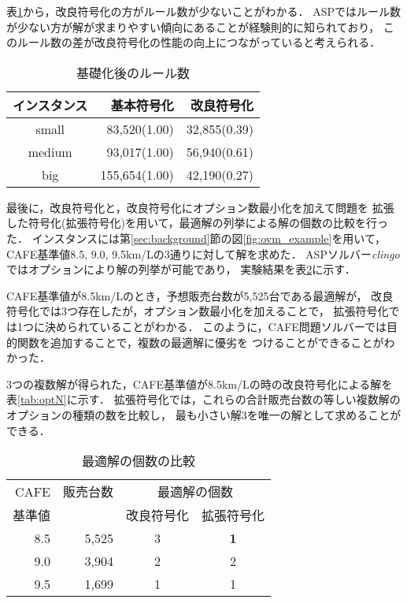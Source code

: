 表\ref{tab:rule}から，改良符号化の方がルール数が少ないことがわかる．
ASPではルール数が少ない方が解が求まりやすい傾向にあることが経験則的に知られており，
このルール数の差が改良符号化の性能の向上につながっていると考えられる．

\begin{table}[tb]
 \caption{基礎化後のルール数}
 \centering
 \begin{tabular}{crr} \bhline
  インスタンス & 基本符号化    & 改良符号化    \\ \hline
  small	    & 83,520(1.00)  & 32,855(0.39) \\ 
  medium    & 93,017(1.00)  & 56,940(0.61) \\
  big	    & 155,654(1.00) & 42,190(0.27) \\ \hline
 \end{tabular}
 \label{tab:rule}
\end{table}


最後に，改良符号化と，改良符号化にオプション数最小化を加えて問題を
拡張した符号化(拡張符号化)を用いて，最適解の列挙による解の個数の比較を行った．
インスタンスには第\ref{sec:background}節の図\ref{fig:ovm_example}を用いて，
CAFE基準値8.5, 9.0, 9.5km/Lの3通りに対して解を求めた．
ASPソルバー\textit{clingo}ではオプションにより解の列挙が可能であり，
実験結果を表\ref{tab:option}に示す．

CAFE基準値が8.5km/Lのとき，予想販売台数が5,525台である最適解が，
改良符号化では3つ存在したが，オプション数最小化を加えることで，
拡張符号化では1つに決められていることがわかる．
このように，CAFE問題ソルバーでは目的関数を追加することで，複数の最適解に優劣を
つけることができることがわかった．

3つの複数解が得られた，CAFE基準値が8.5km/Lの時の改良符号化による解を
表\ref{tab:optN}に示す．
拡張符号化では，これらの合計販売台数の等しい複数解のオプションの種類の数を比較し，
最も小さい解3を唯一の解として求めることができる．


\begin{table}[tb]
 \caption{最適解の個数の比較}
 \centering
  \begin{tabular}{r|r|c|c} \bhline
    \small{CAFE} & \small{販売台数} & \multicolumn{2}{c}{\small{最適解の個数}} \\ \cline{3-4}
    \small{基準値} &     & \small{改良符号化} & \small{拡張符号化}\\ \hline        
    8.5       & 5,525   & 3 & \textbf{1}\\ 
    9.0       & 3,904   & 2 & 2 \\
    9.5       & 1,699   & 1 & 1 \\ \hline
  \end{tabular}
 \label{tab:option}
\end{table}


